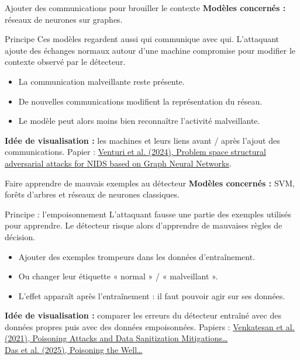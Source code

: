 \documentclass[aspectratio=169,11pt]{beamer}
\begin{document}
\begin{frame}{Ajouter des communications pour brouiller le contexte}
  \textbf{Modèles concernés :} réseaux de neurones sur graphes.
  \vspace{1em}
  \begin{block}{Principe}
    Ces modèles regardent aussi qui communique avec qui.
    L'attaquant ajoute des échanges normaux autour d'une machine compromise
    pour modifier le contexte observé par le détecteur.
  \end{block}
  \begin{itemize}
    \setlength{\itemsep}{.8em}
    \item La communication malveillante reste présente.
    \item De nouvelles communications modifient la représentation du réseau.
    \item Le modèle peut alors moins bien reconnaître l'activité malveillante.
  \end{itemize}
  \vfill
  \textbf{Idée de visualisation :} les machines et leurs liens avant / après
  l'ajout des communications.
  \vfill
  \footnotesize Papier : \href{https://arxiv.org/abs/2403.11830}{Venturi et al. (2024), Problem space structural adversarial attacks for NIDS based on Graph Neural Networks}.
\end{frame}

\begin{frame}{Faire apprendre de mauvais exemples au détecteur}
  \textbf{Modèles concernés :} SVM, forêts d'arbres et réseaux de neurones classiques.
  \vspace{1em}
  \begin{block}{Principe : l'empoisonnement}
    L'attaquant fausse une partie des exemples utilisés pour apprendre.
    Le détecteur risque alors d'apprendre de mauvaises règles de décision.
  \end{block}
  \begin{itemize}
    \setlength{\itemsep}{.8em}
    \item Ajouter des exemples trompeurs dans les données d'entraînement.
    \item Ou changer leur étiquette « normal » / « malveillant ».
    \item L'effet apparaît après l'entraînement : il faut pouvoir agir sur ses données.
  \end{itemize}
  \vfill
  \textbf{Idée de visualisation :} comparer les erreurs du détecteur entraîné
  avec des données propres puis avec des données empoisonnées.
  \vfill
  \footnotesize Papiers : \href{https://doi.org/10.1109/MILCOM52596.2021.9652916}{Venkatesan et al. (2021), Poisoning Attacks and Data Sanitization Mitigations\ldots}
  \\ \href{https://doi.org/10.1109/TNSE.2024.3492032}{Das et al. (2025), Poisoning the Well\ldots}
\end{frame}
\end{document}
